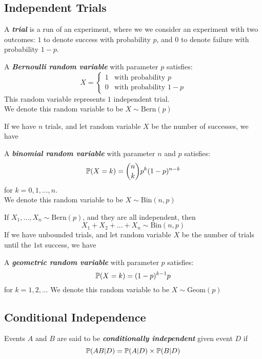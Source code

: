 \subsection{Independent Trials}
A \textbf{\textit{trial}} is a run of an experiment, where we we consider an experiment with two outcomes: $1$ to denote success with probability $p$, and $0$ to denote failure with probability $1 - p$.
\begin{definition}
    A \textbf{\textit{Bernoulli random variable}} with parameter $p$ satisfies:
    $$X = \begin{cases}
        1 & \text{with probability } p \\
        0 & \text{with probability } 1-p
    \end{cases}$$
    This random variable represents $1$ independent trial. \\
    We denote this random variable to be $X \sim \text{Bern}(p)$
\end{definition}
If we have $n$ trials, and let random variable $X$ be the number of successes, we have
\begin{definition}
    A \textbf{\textit{binomial random variable}} with parameter $n$ and $p$ satisfies:
    $$\mathbb{P}(X = k) = \binom{n}{k}p^k(1-p)^{n-k}$$
    for $k = 0, 1, \dots, n$. \\
    We denote this random variable to be $X \sim \text{Bin}(n, p)$
\end{definition}
If $X_1, \dots, X_n \sim \text{Bern}(p)$, and they are all independent, then
$$X_1 + X_2 + \dots + X_n \sim \text{Bin}(n, p)$$
If we have unbounded trials, and let random variable $X$ be the number of trials until the $1$st success, we have
\begin{definition}
    A \textbf{\textit{geometric random variable}} with parameter $p$ satisfies:
    $$\mathbb{P}(X = k) = (1-p)^{k-1}p$$
    for $k = 1, 2, \dots$
    We denote this random variable to be $X \sim \text{Geom}(p)$
\end{definition}

\subsection{Conditional Independence}
\begin{definition}
    Events $A$ and $B$ are said to be \textbf{\textit{conditionally independent}} given event $D$ if
    $$\mathbb{P}(AB|D) = \mathbb{P}(A|D) \times \mathbb{P}(B|D)$$
\end{definition}

\newpage